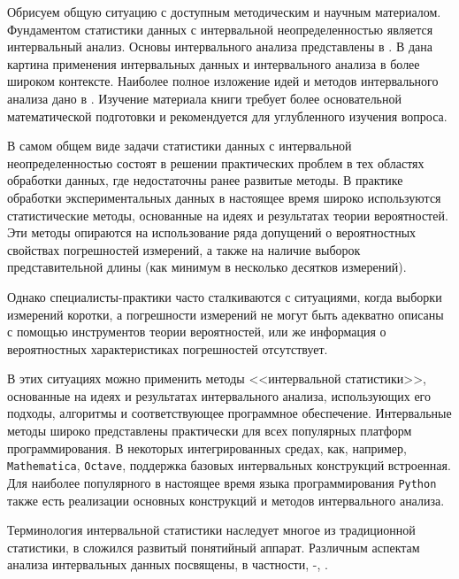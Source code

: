 \documentclass[a5paper,openany]{book}
\begin{document}
{{Обрисуем общую ситуацию с доступным методическим и научным материалом.
Фундаментом статистики данных с интервальной неопределенностью является интервальный анализ. 
Основы интервального анализа представлены в  \cite{SPbSTU2020}. В  \cite{SPbSTU2021} дана картина применения интервальных данных и интервального анализа в более широком контексте. 
Наиболее полное изложение идей и методов интервального анализа дано в  \cite{SSharyBook}. Изучение материала  книги  \cite{SSharyBook} требует более основательной математической подготовки и рекомендуется для углубленного изучения вопроса.






В самом общем виде задачи статистики данных с интервальной неопределенностью состоят в решении практических проблем в тех областях обработки данных, где недостаточны ранее развитые методы.
В практике обработки экспериментальных данных в настоящее время широко используются 
статистические методы, основанные на идеях и результатах теории вероятностей. Эти методы 
опираются на использование ряда допущений о вероятностных свойствах погрешностей 
измерений, а также на наличие выборок представительной длины (как минимум в несколько 
десятков измерений). 

Однако специалисты-практики часто сталкиваются с ситуациями, когда выборки 
измерений коротки, а погрешности 
измерений не могут быть адекватно описаны с помощью инструментов теории вероятностей, 
или же информация о вероятностных характеристиках погрешностей отсутствует. 

В этих ситуациях можно применить методы <<интервальной статистики>>, основанные на идеях и результатах интервального анализа, использующих его подходы, алгоритмы и соответствующее программное обеспечение. 
Интервальные методы широко представлены практически для всех популярных платформ программирования. В некоторых интегрированных средах, как, например, {\tt Mathematica}, {\tt Octave}, поддержка базовых интервальных конструкций встроенная.   
Для наиболее популярного в настоящее время языка программирования {\tt Python} также есть реализации основных конструкций и методов интервального анализа. 

Терминология интервальной 
статистики наследует 
многое из традиционной статистики, в сложился развитый понятийный аппарат. 
Различным аспектам анализа интервальных данных посвящены, в частности,   \cite{SSharyJCT2017}-\cite{Kumkov2013}, \cite{NguyenKreinWuXiang}.

}}
\end{document}
